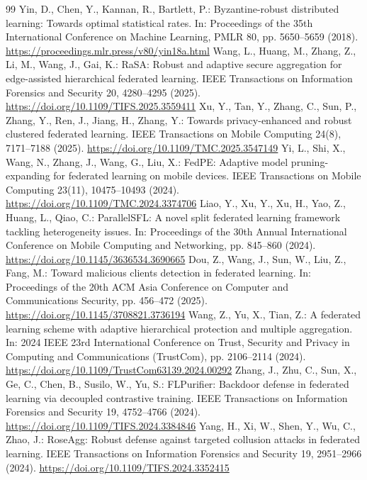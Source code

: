 \documentclass[runningheads,orivec]{llncs}
\begin{document}
\begin{thebibliography}{99}
     Yin, D., Chen, Y., Kannan, R., Bartlett, P.: Byzantine-robust distributed learning: Towards optimal statistical rates. In: Proceedings of the 35th International Conference on Machine Learning, PMLR 80, pp. 5650--5659 (2018). \url{https://proceedings.mlr.press/v80/yin18a.html}
     Wang, L., Huang, M., Zhang, Z., Li, M., Wang, J., Gai, K.: RaSA: Robust and adaptive secure aggregation for edge-assisted hierarchical federated learning. IEEE Transactions on Information Forensics and Security 20, 4280--4295 (2025). \url{https://doi.org/10.1109/TIFS.2025.3559411}
     Xu, Y., Tan, Y., Zhang, C., Sun, P., Zhang, Y., Ren, J., Jiang, H., Zhang, Y.: Towards privacy-enhanced and robust clustered federated learning. IEEE Transactions on Mobile Computing 24(8), 7171--7188 (2025). \url{https://doi.org/10.1109/TMC.2025.3547149}
     Yi, L., Shi, X., Wang, N., Zhang, J., Wang, G., Liu, X.: FedPE: Adaptive model pruning-expanding for federated learning on mobile devices. IEEE Transactions on Mobile Computing 23(11), 10475--10493 (2024). \url{https://doi.org/10.1109/TMC.2024.3374706}
     Liao, Y., Xu, Y., Xu, H., Yao, Z., Huang, L., Qiao, C.: ParallelSFL: A novel split federated learning framework tackling heterogeneity issues. In: Proceedings of the 30th Annual International Conference on Mobile Computing and Networking, pp. 845--860 (2024). \url{https://doi.org/10.1145/3636534.3690665}
     Dou, Z., Wang, J., Sun, W., Liu, Z., Fang, M.: Toward malicious clients detection in federated learning. In: Proceedings of the 20th ACM Asia Conference on Computer and Communications Security, pp. 456--472 (2025). \url{https://doi.org/10.1145/3708821.3736194}
     Wang, Z., Yu, X., Tian, Z.: A federated learning scheme with adaptive hierarchical protection and multiple aggregation. In: 2024 IEEE 23rd International Conference on Trust, Security and Privacy in Computing and Communications (TrustCom), pp. 2106--2114 (2024). \url{https://doi.org/10.1109/TrustCom63139.2024.00292}
     Zhang, J., Zhu, C., Sun, X., Ge, C., Chen, B., Susilo, W., Yu, S.: FLPurifier: Backdoor defense in federated learning via decoupled contrastive training. IEEE Transactions on Information Forensics and Security 19, 4752--4766 (2024). \url{https://doi.org/10.1109/TIFS.2024.3384846}
     Yang, H., Xi, W., Shen, Y., Wu, C., Zhao, J.: RoseAgg: Robust defense against targeted collusion attacks in federated learning. IEEE Transactions on Information Forensics and Security 19, 2951--2966 (2024). \url{https://doi.org/10.1109/TIFS.2024.3352415}

\end{thebibliography}
\end{document}
